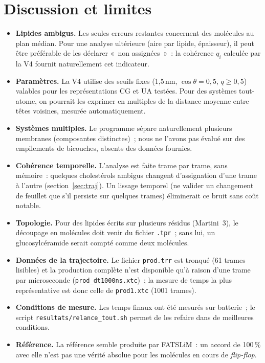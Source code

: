 \documentclass[11pt,a4paper]{article}
\begin{document}
\section{Discussion et limites}
\begin{itemize}
\item \textbf{Lipides ambigus.} Les seules erreurs restantes concernent des molécules au plan médian. Pour une
analyse ultérieure (aire par lipide, épaisseur), il peut être préférable de les déclarer «~non assignées~»~: la
cohérence $q_i$ calculée par la V4 fournit naturellement cet indicateur.
\item \textbf{Paramètres.} La V4 utilise des seuils fixes (1,5\,nm, $\cos\theta=0{,}5$, $q\geq0{,}5$) valables pour
les représentations CG et UA testées. Pour des systèmes tout-atome, on pourrait les exprimer en multiples de la
distance moyenne entre têtes voisines, mesurée automatiquement.
\item \textbf{Systèmes multiples.} Le programme sépare naturellement plusieurs membranes (composantes distinctes)~;
nous ne l'avons pas évalué sur des empilements de bicouches, absents des données fournies.
\item \textbf{Cohérence temporelle.} L'analyse est faite trame par trame, sans mémoire~: quelques cholestérols
ambigus changent d'assignation d'une trame à l'autre (section~\ref{sec:traj}). Un lissage temporel (ne valider un
changement de feuillet que s'il persiste sur quelques trames) éliminerait ce bruit sans coût notable.
\item \textbf{Topologie.} Pour des lipides écrits sur plusieurs résidus (Martini~3), le découpage en molécules doit
venir du fichier \texttt{.tpr}~; sans lui, un glucosylcéramide serait compté comme deux molécules.
\item \textbf{Données de la trajectoire.} Le fichier \texttt{prod.trr} est tronqué (61 trames lisibles) et la
production complète n'est disponible qu'à raison d'une trame par microseconde (\texttt{prod\_dt1000ns.xtc})~; la
mesure de temps la plus représentative est donc celle de \texttt{prod1.xtc} (1001 trames).
\item \textbf{Conditions de mesure.} Les temps finaux ont été mesurés sur batterie~; le script
\texttt{resultats/relance\_tout.sh} permet de les refaire dans de meilleures conditions.
\item \textbf{Référence.} La référence semble produite par FATSLiM~: un accord de 100\,\% avec elle n'est pas une
vérité absolue pour les molécules en cours de \emph{flip-flop}.
\end{itemize}
\end{document}
